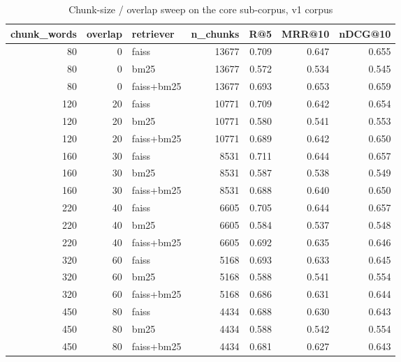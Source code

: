 \begin{table}
\caption{Chunk-size / overlap sweep on the core sub-corpus, v1 corpus}
\label{tab:chunk}
\begin{tabular}{rrlrrrr}
\toprule
chunk\_words & overlap & retriever & n\_chunks & R@5 & MRR@10 & nDCG@10 \\
\midrule
80 & 0 & faiss & 13677 & 0.709 & 0.647 & 0.655 \\
80 & 0 & bm25 & 13677 & 0.572 & 0.534 & 0.545 \\
80 & 0 & faiss+bm25 & 13677 & 0.693 & 0.653 & 0.659 \\
120 & 20 & faiss & 10771 & 0.709 & 0.642 & 0.654 \\
120 & 20 & bm25 & 10771 & 0.580 & 0.541 & 0.553 \\
120 & 20 & faiss+bm25 & 10771 & 0.689 & 0.642 & 0.650 \\
160 & 30 & faiss & 8531 & 0.711 & 0.644 & 0.657 \\
160 & 30 & bm25 & 8531 & 0.587 & 0.538 & 0.549 \\
160 & 30 & faiss+bm25 & 8531 & 0.688 & 0.640 & 0.650 \\
220 & 40 & faiss & 6605 & 0.705 & 0.644 & 0.657 \\
220 & 40 & bm25 & 6605 & 0.584 & 0.537 & 0.548 \\
220 & 40 & faiss+bm25 & 6605 & 0.692 & 0.635 & 0.646 \\
320 & 60 & faiss & 5168 & 0.693 & 0.633 & 0.645 \\
320 & 60 & bm25 & 5168 & 0.588 & 0.541 & 0.554 \\
320 & 60 & faiss+bm25 & 5168 & 0.686 & 0.631 & 0.644 \\
450 & 80 & faiss & 4434 & 0.688 & 0.630 & 0.643 \\
450 & 80 & bm25 & 4434 & 0.588 & 0.542 & 0.554 \\
450 & 80 & faiss+bm25 & 4434 & 0.681 & 0.627 & 0.643 \\
\bottomrule
\end{tabular}
\end{table}
